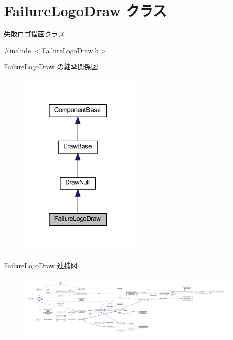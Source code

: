 \hypertarget{class_failure_logo_draw}{}\section{Failure\+Logo\+Draw クラス}
\label{class_failure_logo_draw}


失敗ロゴ描画クラス  




{\ttfamily \#include $<$Failure\+Logo\+Draw.\+h$>$}



Failure\+Logo\+Draw の継承関係図\nopagebreak
\begin{figure}[H]
\begin{center}
\leavevmode
\includegraphics[width=169pt]{class_failure_logo_draw__inherit__graph}
\end{center}
\end{figure}


Failure\+Logo\+Draw 連携図\nopagebreak
\begin{figure}[H]
\begin{center}
\leavevmode
\includegraphics[width=350pt]{class_failure_logo_draw__coll__graph}
\end{center}
\end{figure}
